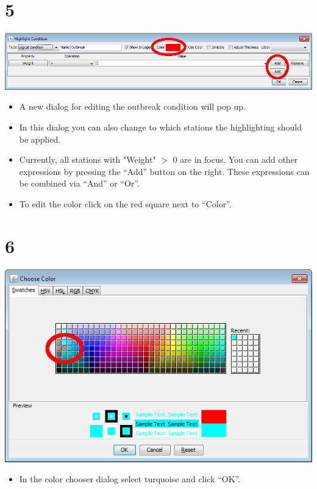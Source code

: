 \documentclass[10pt]{beamer}
\begin{document}
\section{5}
\begin{frame}
	\begin{center}
  		\includegraphics[scale=0.3]{5.png}
	\end{center}
	\begin{itemize}
		\item A new dialog for editing the outbreak condition will pop up.
		\item In this dialog you can also change to which stations the highlighting should be applied.
		\item Currently, all stations with "Weight" $>$ 0 are in focus. You can add other expressions by pressing the ``Add'' button on the right. These expressions can be combined via ``And'' or ``Or''.
		\item To edit the color click on the red square next to ``Color''.
	\end{itemize}
\end{frame}

\section{6}
\begin{frame}
	\begin{center}
  		\includegraphics[height=0.6\textheight]{6.png}
	\end{center}
	\begin{itemize}
		\item In the color chooser dialog select turquoise and click ``OK''.
	\end{itemize}
\end{frame}
\end{document}
